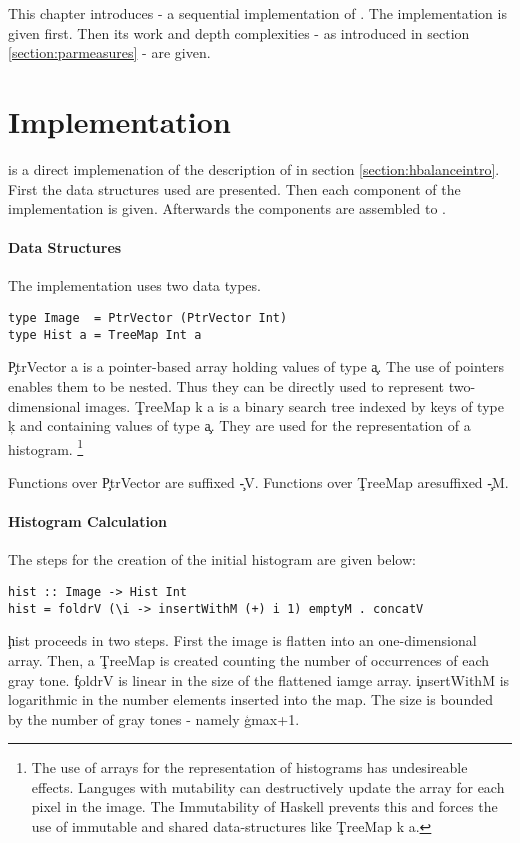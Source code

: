 

This chapter introduces \seq - a sequential implementation
of \algo. The implementation is given first. Then
its work and depth complexities - as introduced in section \ref{section:parmeasures}
- are given.


\section{Implementation}
  \seq is a direct implemenation of the description of \algo
  in section \ref{section:hbalanceintro}.
  First the data structures used are presented.
  Then each component of the implementation is given. Afterwards
  the components are assembled to \seq.
  
  \paragraph{Data Structures}
    The implementation uses two data types.
    \begin{lstlisting}
type Image  = PtrVector (PtrVector Int)
type Hist a = TreeMap Int a
    \end{lstlisting}
    \c{PtrVector a} is a pointer-based array holding values
    of type \c{a}. The use of pointers enables them to be nested.
    Thus they can be directly used to represent two-dimensional images.
    \c{TreeMap k a} is a binary search tree indexed by keys of type
    \c{k} and containing values of type \c{a}. They are
    used for the representation of a histogram.
    \footnote{The use of arrays for the representation of
    histograms has undesireable effects. Languges with
    mutability can destructively update the array
    for each pixel in the image. The Immutability
    of Haskell prevents this and forces the use of
    immutable and shared data-structures like \c{TreeMap k a}.}
    
    Functions over \c{PtrVector} are suffixed \c{-V}.
    Functions over \c{TreeMap} aresuffixed \c{-M}.
  
  \paragraph{Histogram Calculation}
    The steps for the creation of the initial histogram are given below:
    \begin{lstlisting}
hist :: Image -> Hist Int
hist = foldrV (\i -> insertWithM (+) i 1) emptyM . concatV
    \end{lstlisting}
    \c{hist} proceeds in two steps. First the image is flatten
    into an one-dimensional array. Then, a \c{TreeMap} is created
    counting the number of occurrences of each gray tone.
    \c{foldrV} is linear in the size of the flattened iamge array.
    \c{insertWithM} is logarithmic in the number elements
    inserted into the map. The size is bounded by the number of 
    gray tones - namely \c{gmax+1}.
    
